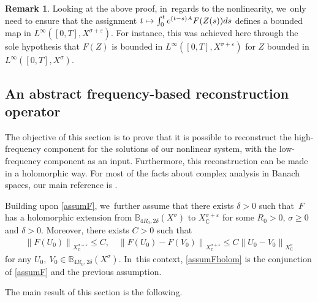 \documentclass[11pt]{article}
\newcommand\mto{\mathchoice{\longmapsto}{\mapsto}{\mapsto}{\mapsto}}
\theoremstyle{definition}
\newtheorem{remark}[theorem]{Remark}
\let\veps\varepsilon
\newcommand\nor[2]{\left\|#1\right\|_{#2}}
\begin{document}
\begin{remark}\label{rk:abs-prop-reg}
Looking at the above proof, in~regards to the nonlinearity, we~only need to ensure that the assignment $t\mto \int_0^t e^{(t-s)A}F(Z(s))ds$ defines a bounded map in $L^\infty([0, T], X^{\sigma+\veps})$. For instance, this was achieved here through the sole hypothesis that $F(Z)$ is bounded in $L^\infty([0, T], X^{\sigma+\veps})$ for $Z$ bounded in $L^\infty([0, T], X^\sigma)$.
\end{remark}

\subsection{An abstract frequency-based reconstruction operator} The objective of this section is to prove that it is possible to reconstruct the high-frequency component for the solutions of our nonlinear system, with the low-frequency component as an input. Furthermore, this reconstruction can be made in a holomorphic way. For most of the facts about complex analysis in Banach spaces, our main reference is \cite{Muj86}.

Building upon \cref{assumF}, we~further assume that there exists $\delta>0$ such that~$F$ has a holomorphic extension from $\mathbb{B}_{4R_{0},2\delta}(X^{\sigma})$ to $X^{\sigma+\veps}_{\mathbb{C}}$ for some $R_{0}>0$, $\sigma\geq 0$ and $\delta>0$. Moreover, there exists $C>0$ such that
\begin{align}
\label{boundFanalytic}
\nor{F(U_{0})}{X^{\sigma+\veps}_{\mathbb{C}}}\leq C,\quad \nor{F(U_{0})-F(V_{0})}{X^{\sigma+\veps}_{\mathbb{C}}}\leq C \nor{U_{0}-V_{0}}{X^{\sigma}_{\mathbb{C}}}
\end{align}
for any $U_{0},~V_{0}\in \mathbb{B}_{4R_{0},2\delta}(X^{\sigma})$. In~this context, \cref{assumFholom} is the conjunction of \cref{assumF} and the previous assumption.

The main result of this section is the following.
\end{document}
